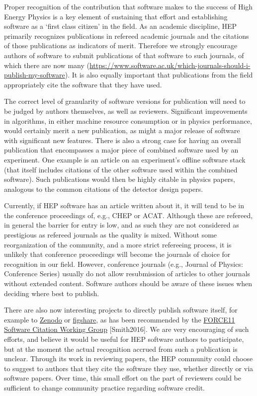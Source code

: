 \documentclass[12pt,a4paper]{article}
\begin{document}
Proper recognition of the contribution that software makes to the
success of High Energy Physics is a key element of sustaining that
effort and establishing software as a `first class citizen' in the
field. As an academic discipline, HEP primarily recognizes publications
in refereed academic journals and the citations of those publications as
indicators of merit. Therefore we strongly encourage authors of software
to submit publications of that software to such journals, of which there
are now many
(\href{https://www.software.ac.uk/which-journals-should-i-publish-my-software}{{https://www.software.ac.uk/which-journals-should-i-publish-my-software}}).
It is also equally important that publications from the field
appropriately cite the software that they have used.

The correct level of granularity of software versions for publication
will need to be judged by authors themselves, as well as reviewers.
Significant improvements in algorithms, in either machine resource
consumption or in physics performance, would certainly merit a new
publication, as might a major release of software with significant new
features. There is also a strong case for having an overall publication
that encompasses a major piece of combined software used by an
experiment. One example is an article on an experiment's offline
software stack (that itself includes citations of the other software
used within the combined software). Such publications would then be
highly citable in physics papers, analogous to the common citations of
the detector design papers.

Currently, if HEP software has an article written about it, it will tend
to be in the conference proceedings of, e.g., CHEP or ACAT. Although
these are refereed, in general the barrier for entry is low, and as such
they are not considered as prestigious as refereed journals as the
quality is mixed. Without some reorganization of the community, and a
more strict refereeing process, it is unlikely that conference
proceedings will become the journals of choice for recognition in our
field. However, conference journals (e.g., Journal of Physics:
Conference Series) usually do not allow resubmission of articles to
other journals without extended content. Software authors should be
aware of these issues when deciding where best to publish.

There are also now interesting projects to directly publish software
itself, for example to \href{http://zenodo.org}{{Zenodo}} or
\href{https://figshare.com}{{figshare}}, as has been recommended by the
\href{https://www.force11.org/group/software-citation-working-group}{{FORCE11
Software Citation Working Group}} {[}Smith2016{]}. We are very
encouraging of such efforts, and believe it would be useful for HEP
software authors to participate, but at the moment the actual
recognition accrued from such a publication is unclear. Through its work
in reviewing papers, the HEP community could choose to suggest to
authors that they cite the software they use, whether directly or via
software papers. Over time, this small effort on the part of reviewers
could be sufficient to change community practice regarding software
credit.
\end{document}
